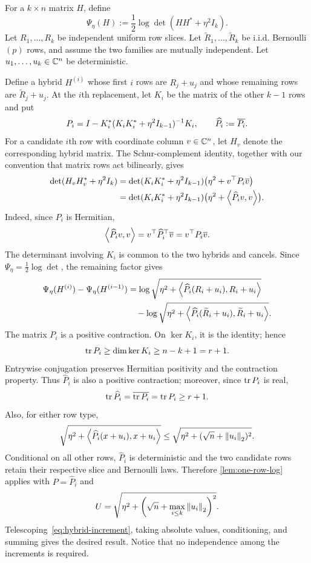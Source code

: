 For a $k\times n$ matrix $H$, define
\[
  \Psi_\eta(H):=\frac12\log\det(HH^*+\eta^2I_k).
\]
Let $R_1,\ldots,R_k$ be independent uniform row slices. Let $\widetilde R_1,\ldots,\widetilde R_k$ be i.i.d. Bernoulli$(p)$ rows, and assume the two families are mutually independent. Let $u_1,\ldots,u_k\in\mathbb C^n$ be deterministic.

Define a hybrid $H^{(i)}$ whose first $i$ rows are $R_j+u_j$ and whose remaining rows are $\widetilde R_j+u_j$. At the $i$th replacement, let $K_i$ be the matrix of the other $k-1$ rows and put
\begin{equation}\label{eq:Pi-hybrid}
  P_i=I-K_i^*(K_iK_i^*+\eta^2I_{k-1})^{-1}K_i,
  \qquad
  \widehat P_i:=\overline{P_i}.
\end{equation}
For a candidate $i$th row with coordinate column $v\in\mathbb C^n$, let $H_v$ denote the corresponding hybrid matrix. The Schur-complement identity, together with our convention that matrix rows act bilinearly, gives
\begin{align}
  \det(H_vH_v^*+\eta^2I_k)
  &=\det(K_iK_i^*+\eta^2I_{k-1})
  \bigl(\eta^2+v^\top P_i\overline v\bigr)\notag\\
  &=\det(K_iK_i^*+\eta^2I_{k-1})
  \bigl(\eta^2+\left\langle \widehat P_iv,v\right\rangle\bigr).
  \label{eq:Schur-hybrid}
\end{align}
Indeed, since $P_i$ is Hermitian,
\[
  \left\langle \widehat P_iv,v\right\rangle
  =v^\top\widehat P_i^\top\overline v
  =v^\top P_i\overline v.
\]
The determinant involving $K_i$ is common to the two hybrids and cancels. Since $\Psi_\eta=\frac12\log\det$, the remaining factor gives
\begin{align}
  \Psi_\eta(H^{(i)})-\Psi_\eta(H^{(i-1)})
  &=\log\sqrt{\eta^2+\left\langle \widehat P_i(R_i+u_i),R_i+u_i\right\rangle}\notag\\
  &\quad-\log\sqrt{\eta^2+\left\langle \widehat P_i(\widetilde R_i+u_i),\widetilde R_i+u_i\right\rangle}.
  \label{eq:hybrid-increment}
\end{align}
The matrix $P_i$ is a positive contraction. On $\ker K_i$, it is the identity; hence
\begin{equation}\label{eq:trace-Pi}
  \operatorname{tr} P_i\ge\dim\ker K_i\ge n-k+1=r+1.
\end{equation}
Entrywise conjugation preserves Hermitian positivity and the contraction property. Thus $\widehat P_i$ is also a positive contraction; moreover, since $\operatorname{tr} P_i$ is real,
\[
  \operatorname{tr}\widehat P_i=\overline{\operatorname{tr} P_i}=\operatorname{tr} P_i\ge r+1.
\]
Also, for either row type,
\[
  \sqrt{\eta^2+\left\langle \widehat P_i(x+u_i),x+u_i\right\rangle}
  \le\sqrt{\eta^2+(\sqrt n+\left\|u_i\right\|_2)^2}.
\]
Conditional on all other rows, $\widehat P_i$ is deterministic and the two candidate rows retain their respective slice and Bernoulli laws. Therefore 
\cref{lem:one-row-log} applies with $P=\widehat P_i$ and
\[
  U=\sqrt{\eta^2+\left(\sqrt n+\max_{i\le k}\left\|u_i\right\|_2\right)^2}.
\]
Telescoping~\eqref{eq:hybrid-increment}, taking absolute values, conditioning, and summing gives the desired result. Notice that no independence among the increments is required.

